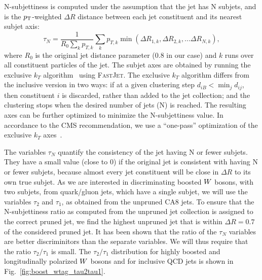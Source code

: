 N-subjettiness is computed under the assumption that the jet has N subjets, and is the
$p_{\mathrm{T}}$-weighted $\Delta R$ distance between each jet constituent and its nearest subjet axis:
\begin{equation}
\tau_N = \frac{1}{R_0 \sum_{k} p_{T, k}} \sum_k p_{T, k} \min (\Delta R_{1,k}, \Delta R_{2,k}, ...
\Delta R_{N,k}),
\end{equation}
where $R_0$ is the original jet distance parameter (0.8 in our case) and $k$ runs over all
constituent particles of the jet. 
The subjet axes are obtained by running the exclusive $k_T$
algorithm~\cite{Ellis:1993tq,Catani:1993hr} using \textsc{FastJet}. 
The exclusive $k_T$ algorithm differs from the inclusive version in two ways: if at a given
clustering step $d_{iB} < \min_j d_{ij}$, then constituent $i$ is discarded, rather than added to
the jet collection; and the clustering stops when the desired number of jets (N) is reached. 
The resulting axes can be further optimized to minimize the N-subjettiness value. In accordance to
the CMS recommendation, we use a “one-pass” optimization of the exclusive $k_T$
axes~\cite{nsubjettiness_fastjet}.

The variables $\tau_N$ quantify the consistency of the jet having N or fewer subjets. They have a
small value (close to 0) if the original jet is consistent with having N or fewer subjets, because
almost every jet constituent will be close in $\Delta R$ to its own true subjet. 
As we are interested in discriminating boosted $W$ bosons, with two subjets, from quark/gluon
jets, which have a single subjet, we will use the variables $\tau_2$ and $\tau_1$, as obtained
from the unpruned CA8 jets. To ensure that the N-subjettiness ratio as computed from the unpruned
jet collection is assigned to the correct pruned jet, we find the highest \pt unpruned jet that is
within $\Delta R = 0.7$ of the considered pruned jet.  
It has been shown that the ratio of the $\tau_N$ variables are better discriminitors than the
separate variables. We will thus require that the ratio $\tau_2 / \tau_1$ is small. The $\tau_2 /
\tau_1$ distribution for highly boosted and longitudinally polarized $W$ bosons and for inclusive
QCD jets is shown in Fig.~\ref{fig:boost_wtag_tau2tau1}. 

